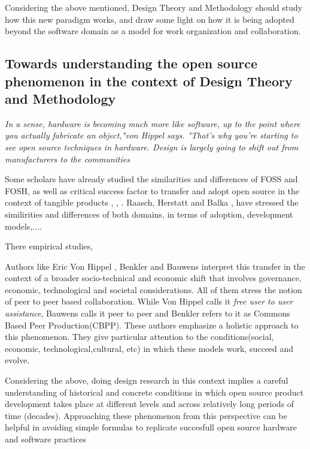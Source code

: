 \documentclass{ICED-Paper}%
\begin{document}
Considering the above mentioned, Design Theory and Methodology should study how this new paradigm works, and draw some light on how it is being adopted beyond the software domain as a model for work organization and collaboration.
\bigskip

\subsection{ Towards understanding the open source phenomenon in the context of Design Theory and Methodology}

\emph{In a sense, hardware is becoming much more like software, up to the point where you actually fabricate an object,"von Hippel says. "That's why you're starting to see open source techniques in hardware. Design is largely going to shift out from manufacturers to the communities}\cite{OH_works?}
\bigskip

Some scholars have already studied the similarities and differences of FOSS and FOSH, as well as critical success factor to transfer and adopt open source in the context of tangible products \cite{}, \cite{}, \cite{}. Raasch, Herstatt and Balka \cite{OSTangible}, have stressed the similirities and differences of both domains, in terms of adoption, development models,....
\bigskip


There empirical studies,
\bigskip


Authors like Eric Von Hippel \cite{hippel_2}, Benkler \cite{Benkler} and Bauwens \cite{p2pEconomy} interpret this transfer in the context of a broader socio-technical and economic shift that involves governance, economic, technological and societal considerations. All of them stress the notion of peer to peer based collaboration.
While Von Hippel calls it \emph{free user to user assistance}, Bauwens calls it peer to peer and Benkler refers to it as Commons Based Peer Production(CBPP). These authors emphasize a holistic approach to this phenomenon. They give particular attention to the conditions(social, economic, technological,cultural, etc) in which these models work, succeed and evolve.
\bigskip

Considering the above, doing design research in this context implies a careful understanding of historical and concrete conditions in which open source product development takes place at different levels and across relatively long periods of time (decades). Approaching these phenomenon from this perspective can be helpful in avoiding simple formulas to replicate succesfull open source hardware and software practices
\end{document}
